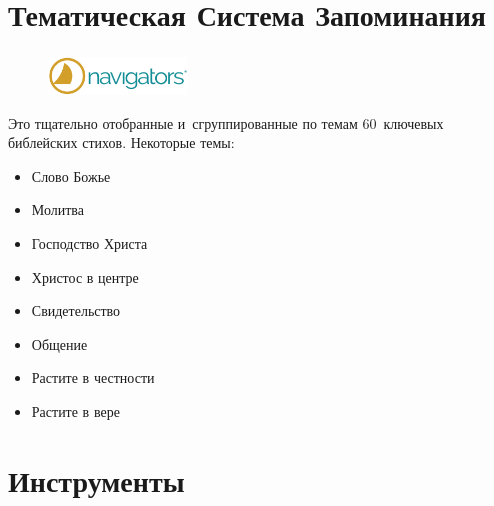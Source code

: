 \documentclass[t,aspectratio=169]{beamer}  %
\begin{document}
\section{Тематическая Система Запоминания}
\begin{frame}[c]
	\frametitle{\insertsection}
	\framesubtitle{\insertsubsection}
	\begin{figure}
		\begin{flushright}
		\vspace{-2.2cm}
		\includegraphics[height=1cm]{navs-logo}
	\end{flushright}
		\end{figure}
		\vspace{0.4cm}
	Это тщательно отобранные и~сгруппированные по темам 60~ключевых библейских стихов.
	Некоторые темы:
	\begin{itemize}
		\item Слово Божье
		\item Молитва 
		\item Господство Христа
		\item Христос в центре
		\item Свидетельство
		\item Общение
		\item Растите в честности
		\item Растите в вере
	\end{itemize}		
\end{frame}
\section{Инструменты}
\end{document}
